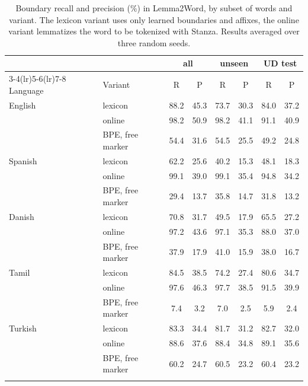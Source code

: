 \begin{table}[!ht]
\centering
\caption{Boundary recall and precision (\%) in Lemma2Word, by subset of words and variant. The lexicon variant uses only learned boundaries and affixes, the online variant lemmatizes the word to be tokenized with Stanza. Results averaged over three random seeds.}
\label{tab:l2w}
\small
\setlength{\tabcolsep}{3.5pt}
\begin{tabular}{llcccccc}
\toprule
 & & \multicolumn{2}{c}{all} & \multicolumn{2}{c}{unseen} & \multicolumn{2}{c}{UD test} \\
\cmidrule(lr){3-4}\cmidrule(lr){5-6}\cmidrule(lr){7-8}
Language & Variant & R & P & R & P & R & P \\
\midrule
English & lexicon & 88.2 & 45.3 & 73.7 & 30.3 & 84.0 & 37.2 \\
 & online & 98.2 & 50.9 & 98.2 & 41.1 & 91.1 & 40.9 \\
 & BPE, free marker & 54.4 & 31.6 & 54.5 & 25.5 & 49.2 & 24.8 \\
\addlinespace[2pt]
Spanish & lexicon & 62.2 & 25.6 & 40.2 & 15.3 & 48.1 & 18.3 \\
 & online & 99.1 & 39.0 & 99.1 & 35.4 & 94.8 & 34.2 \\
 & BPE, free marker & 29.4 & 13.7 & 35.8 & 14.7 & 31.8 & 13.2 \\
\addlinespace[2pt]
Danish & lexicon & 70.8 & 31.7 & 49.5 & 17.9 & 65.5 & 27.2 \\
 & online & 97.2 & 43.6 & 97.1 & 35.3 & 88.0 & 37.0 \\
 & BPE, free marker & 37.9 & 17.9 & 41.0 & 15.9 & 38.0 & 16.7 \\
\addlinespace[2pt]
Tamil & lexicon & 84.5 & 38.5 & 74.2 & 27.4 & 80.6 & 34.7 \\
 & online & 97.6 & 46.3 & 97.7 & 38.5 & 91.5 & 39.9 \\
 & BPE, free marker & 7.4 & 3.2 & 7.0 & 2.5 & 5.9 & 2.4 \\
\addlinespace[2pt]
Turkish & lexicon & 83.3 & 34.4 & 81.7 & 31.2 & 82.7 & 32.0 \\
 & online & 88.6 & 37.6 & 88.4 & 34.8 & 89.1 & 35.6 \\
 & BPE, free marker & 60.2 & 24.7 & 60.5 & 23.2 & 60.4 & 23.2 \\
\addlinespace[2pt]
\bottomrule
\end{tabular}
\end{table}
